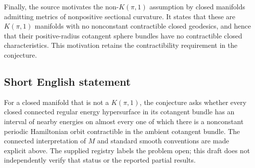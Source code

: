 \documentclass[11pt]{article}
\begin{document}
Finally, the source motivates the non-\(K(\pi,1)\) assumption by closed manifolds admitting metrics of nonpositive sectional curvature. It states that these are \(K(\pi,1)\) manifolds with no nonconstant contractible closed geodesics, and hence that their positive-radius cotangent sphere bundles have no contractible closed characteristics. This motivation retains the contractibility requirement in the conjecture.
\subsection{Short English statement}
For a closed manifold that is not a \(K(\pi,1)\), the conjecture asks whether every closed connected regular energy hypersurface in its cotangent bundle has an interval of nearby energies on almost every one of which there is a nonconstant periodic Hamiltonian orbit contractible in the ambient cotangent bundle. The connected interpretation of \(M\) and standard smooth conventions are made explicit above. The supplied registry labels the problem open; this draft does not independently verify that status or the reported partial results.
\end{document}

